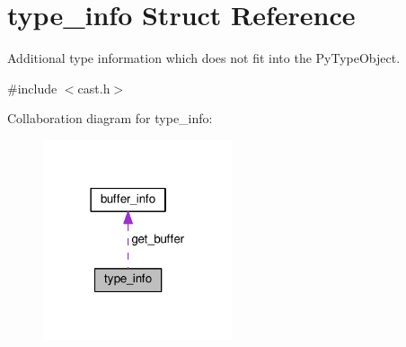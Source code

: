 \hypertarget{structtype__info}{}\section{type\+\_\+info Struct Reference}
\label{structtype__info}


Additional type information which does not fit into the Py\+Type\+Object.  




{\ttfamily \#include $<$cast.\+h$>$}



Collaboration diagram for type\+\_\+info\+:
\nopagebreak
\begin{figure}[H]
\begin{center}
\leavevmode
\includegraphics[width=158pt]{structtype__info__coll__graph}
\end{center}
\end{figure}
